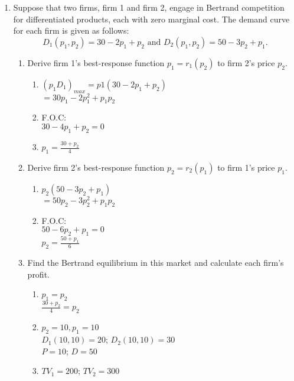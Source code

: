 \documentclass[11pt]{article}
\begin{document}
\begin{enumerate}
\begin{enumerate}
\begin{enumerate}
                \end{enumerate}
    \end{enumerate}
\pagebreak
\item Suppose that two firms, firm 1 and firm 2, engage in Bertrand competition for differentiated products, each with zero marginal cost. The demand curve for each firm is given as follows:
	\begin{equation*}
	D_{1}(p_{1},p_{2})=30-2p_{1}+p_{2}\text{ and }D_{2}(p_{1},p_{2})=50-3p_{2}+p_{1}.
	\end{equation*}
	\begin{enumerate}
	\item Derive firm 1's best-response function $p_{1}=r_{1}(p_{2})$ to firm 2's price $p_{2}$.
    \begin{enumerate}
        \item $(p_{1}D_{1})_{max} = p1(30-2p_1+p_2)$ 
        \\$= 30p_1 - 2p_1^2+p_1p_2$
        \item F.O.C:\\
        $30-4p_1 + p_2 = 0$
        \item $p_1 = \frac{30 + p_2}{4}$
    \end{enumerate}

    \item Derive firm 2's best-response function $p_{2}=r_{2}(p_{1})$ to firm 1's price $p_{1}$.
    \begin{enumerate}
        \item $p_2 (50 - 3p_2 + p_1)$\\
        $= 50p_2 - 3p_2^2 + p_1p_2$
        \item F.O.C:\\
        $50 - 6p_2 + p_1 = 0$\\
        $p_2 = \frac{50 + p_1}{6}$
    \end{enumerate}
	\item Find the Bertrand equilibrium in this market and calculate each firm's profit.
    \begin{enumerate}
        \item $p_1 = p_2$\\
        $\frac{30+p_2}{4} = p_2$
        \item $p_2 = 10, p_1 = 10$\\
        $D_1(10,10) = 20$; $D_2(10,10) = 30$\\
        $P = 10$; $D = 50$
        \item $TV_1 = 200$; $TV_2 = 300$
    \end{enumerate}

	\end{enumerate}

\end{enumerate}
\end{document}
